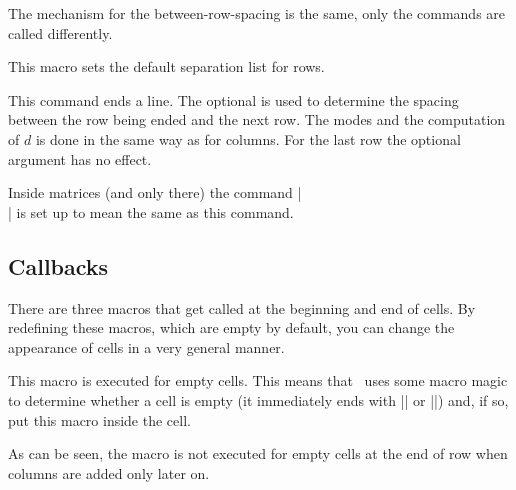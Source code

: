 The mechanism for the between-row-spacing is the same, only the commands are
called differently.

\begin{command}{\pgfsetmatrixrowsep{}}
    This macro sets the default separation list for rows.
\end{command}

\begin{command}{\pgfmatrixendrow{}}
    This command ends a line. The optional  is used
    to determine the spacing between the row being ended and the next row. The
    modes and the computation of $d$ is done in the same way as for columns.
    For the last row the optional argument has no effect.

    Inside matrices (and only there) the command |\\| is set up to mean the
    same as this command.
\end{command}


\subsection{Callbacks}
\label{section-matrix-callbacks}

There are three macros that get called at the beginning and end of cells. By
redefining these macros, which are empty by default, you can change the
appearance of cells in a very general manner.

\begin{command}{\pgfmatrixemptycode}
    This macro is executed for empty cells. This means that \pgfname\ uses some
    macro magic to determine whether a cell is empty (it immediately ends with
    |\pgfmatrixemptycode| or |\pgfmatrixendrow|) and, if so, put this macro
    inside the cell.
\begin{codeexample}[]
\end{codeexample}
    As can be seen, the macro is not executed for empty cells at the end of row
    when columns are added only later on.
\end{command}

